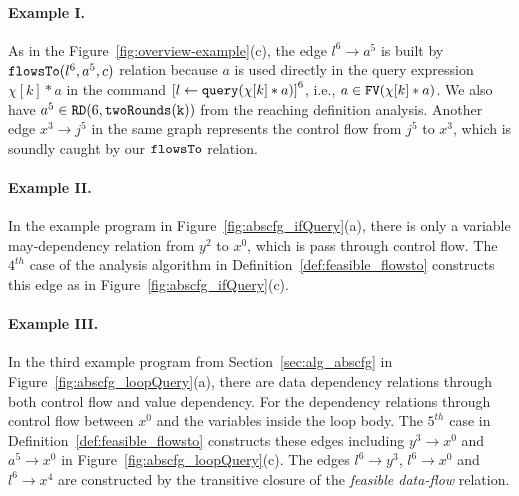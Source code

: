\paragraph{Example I.}
As in the Figure~\ref{fig:overview-example}(c), 
the edge $l^6 \to a^5$ is built by $\mathtt{flowsTo}(l^6, a^5, c)$ relation because
$a$ is used directly in the query expression $\chi[k]*a$
in the command $\clabel{\assign{l}{\query(\chi[k]*a)}}^6$,
i.e., $a \in \mathtt{FV}(\chi[k]*a)$.
We also have $a^5 \in \mathtt{RD}(6, \mathtt{twoRounds(k)})$ from the reaching definition analysis.
Another edge $x^3 \to j^5$ in the same graph represents the control flow from $j^5$ to $x^3$, which is soundly caught by our $\mathtt{flowsTo}$ relation.

\paragraph{Example II.}
In the example program in Figure~\ref{fig:abscfg_ifQuery}(a), there is only a variable may-dependency relation from $y^2$ to $x^0$, which is pass through control flow.
The $4^{th}$ case of the analysis algorithm in Definition~\ref{def:feasible_flowsto} constructs this edge as in Figure~\ref{fig:abscfg_ifQuery}(c).  

\paragraph{Example III.}
In the third example program from Section~\ref{sec:alg_abscfg} in Figure~\ref{fig:abscfg_loopQuery}(a),
there are data dependency relations through both control flow and value dependency.
For the dependency relations through control flow between $x^0$ and the variables inside the loop body.
The $5^{th}$ case in Definition~\ref{def:feasible_flowsto} constructs these edges
including $y^3 \to x^0$ and $a^5 \to x^0$ in Figure~\ref{fig:abscfg_loopQuery}(c).  
The edges $l^6 \to y^3$, $l^6 \to x^0$ and $l^6 \to x^4$ are constructed by the
transitive closure of the \emph{feasible data-flow} relation.